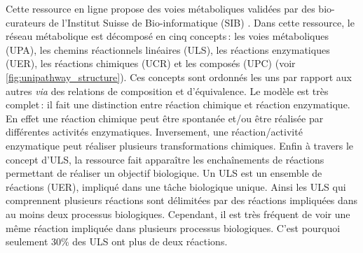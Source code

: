 \begin{refsegment}
    Cette ressource en ligne propose des voies métaboliques validées par des bio-curateurs de l'Institut Suisse de Bio-informatique (SIB) \cite{morgat2011unipathway}. Dans cette ressource, le réseau métabolique est décomposé en cinq concepts : les voies métaboliques (\gls{UPA}), les chemins réactionnels linéaires (\gls{ULS}), les réactions enzymatiques (\gls{UER}), les réactions chimiques (\gls{UCR}) et les composés (\gls{UPC}) (voir \cref{fig:unipathway_structure}). Ces concepts sont ordonnés les uns par rapport aux autres \textit{via} des relations de composition et d'équivalence. Le modèle est très complet : il fait une distinction entre réaction chimique et réaction enzymatique. En effet une réaction chimique peut être spontanée et/ou être réalisée par différentes activités enzymatiques. Inversement, une réaction/activité enzymatique peut réaliser plusieurs transformations chimiques. Enfin à travers le concept d'\gls{ULS}, la ressource fait apparaître les enchaînements de réactions permettant de réaliser un objectif biologique. Un \gls{ULS} est un ensemble de réactions (\gls{UER}), impliqué dans une tâche biologique unique. Ainsi les \gls{ULS} qui comprennent plusieurs réactions sont délimitées par des réactions impliquées dans au moins deux processus biologiques. Cependant, il est très fréquent de voir une même réaction impliquée dans plusieurs processus biologiques. C'est pourquoi seulement 30\% des \gls{ULS} ont plus de deux réactions.
    

\end{refsegment}

